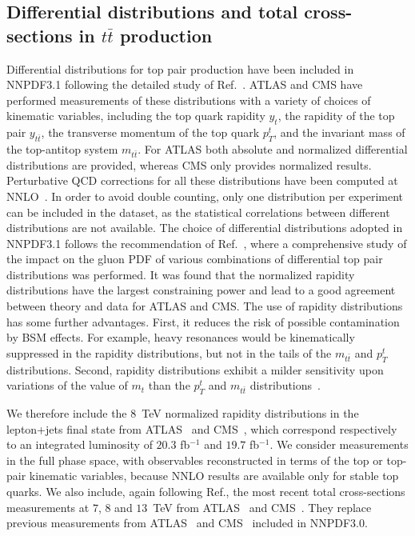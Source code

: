 \subsection{Differential distributions and total
  cross-sections in $t\bar{t}$ production}
\label{sec:topdata}

Differential distributions for top pair production have been
included in NNPDF3.1 following the detailed study of Ref.~\cite{Czakon:2016olj}.
ATLAS and CMS have performed measurements of these distributions with a
variety of choices of kinematic variables, including the top quark rapidity
$y_t$, the rapidity of the top pair $y_{t\bar{t}}$, the transverse 
momentum of the top quark $p_T^t$, and the invariant mass of the top-antitop
system $m_{t\bar{t}}$. For ATLAS both absolute and normalized 
differential distributions are provided, whereas CMS only provides
normalized results.
%
Perturbative QCD corrections for all these distributions have been 
computed at NNLO~\cite{Czakon:2015owf,Czakon:2016dgf}.
%
In order to avoid double counting, only one distribution per
experiment can be included in the dataset, as the statistical correlations
between different distributions are not available.
%
The choice of differential distributions adopted in NNPDF3.1 follows the 
recommendation of Ref.~\cite{Czakon:2016olj}, where
a comprehensive study of the impact on the gluon PDF of 
various combinations of differential top pair distributions was performed. 
%
It was found that the normalized rapidity distributions have the
largest constraining power and lead to a good agreement between theory and data
for ATLAS and CMS.
%
The use of rapidity distributions has some further  advantages.
%
First, it reduces the risk of possible contamination by BSM effects.
%
For example, heavy resonances would be kinematically suppressed
in the rapidity distributions, but not in the tails of the $m_{t\bar{t}}$ and 
$p_T^t$ distributions.
%
Second, rapidity distributions exhibit a milder sensitivity upon variations 
of the value of $m_t$ than the $p_T^t$ and $m_{t\bar{t}}$ 
distributions~\cite{Czakon:2016vfr}.

We therefore include the $8$~TeV normalized
rapidity distributions in the lepton+jets final
state from ATLAS~\cite{Aad:2015mbv} and 
CMS~\cite{Khachatryan:2015oqa}, which 
correspond respectively to an integrated
luminosity of $20.3$ fb$^{-1}$ and $19.7$ fb$^{-1}$. 
%
We consider measurements in the full phase space, with observables 
reconstructed in terms of the top or top-pair kinematic variables, because
NNLO results are available only for stable top quarks.
We also include, again following Ref.\cite{Czakon:2016olj},
the most recent total cross-sections measurements at $7$, $8$ and $13$~TeV from
ATLAS~\cite{Aad:2014kva,Aaboud:2016pbd} and
CMS~\cite{Khachatryan:2016mqs,CMS:2016syx}.
%
They replace previous measurements from 
ATLAS~\cite{ATLAS:2012aa,ATLAS:2011xha,TheATLAScollaboration:2013dja}
and CMS~\cite{Chatrchyan:2013faa,Chatrchyan:2012bra,Chatrchyan:2012ria} 
included in NNPDF3.0. 

